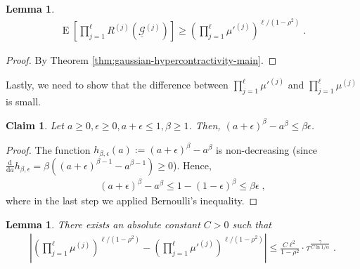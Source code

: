 \documentclass{daj}
\newcommand{\1}{\mathbbm{1}}
\theoremstyle{plain}
\newtheorem{lemma}[theorem]{Lemma}
\newtheorem{claim}[theorem]{Claim}
\theoremstyle{definition}
\DeclareMathOperator*{\EE}{E}
\begin{document}
\begin{lemma}
\label{lem:main-gaussian}
\begin{align*}
\EE \left[ \prod_{j=1}^\ell R^{(j)}(\underline{\mathcal{G}}^{(j)}) \right]
  \ge \left( \prod_{j=1}^\ell \mu'^{(j)} \right)^{\ell / (1-\rho^2)} \; .
\end{align*}
\end{lemma}

\begin{proof}
By Theorem \ref{thm:gaussian-hypercontractivity-main}.
\end{proof}

Lastly, we need to show that the difference between
$\prod_{j=1}^\ell \mu'^{(j)}$ and
$\prod_{j=1}^\ell \mu^{(j)}$ is small.

\begin{claim}
\label{cl:bound-mu}
Let $a \ge 0, \epsilon \ge 0, a+\epsilon \le 1, \beta \ge 1$.
Then, $(a+\epsilon)^\beta - a^\beta \le \beta\epsilon$.
\end{claim}
\begin{proof}
The function $h_{\beta,\epsilon}(a) := (a+\epsilon)^\beta-a^{\beta}$
is non-decreasing (since 
$\frac{\mathrm{d}}{\mathrm da} h_{\beta,\epsilon} = 
\beta((a+\epsilon)^{\beta-1}-a^{\beta-1}) \geq 0$).
Hence, 
\begin{align*}
(a+\epsilon)^\beta-a^\beta \le 1-(1-\epsilon)^\beta \le \beta \epsilon \; ,
\end{align*}
where in the last step we applied Bernoulli's inequality.
\end{proof}

\begin{lemma}
\label{lem:main-mu}
There exists an absolute constant $C > 0$ such that
\begin{align*}
\left| \left( \prod_{j=1}^\ell \mu^{(j)} \right)^{\ell / (1-\rho^2)}  - 
\left( \prod_{j=1}^\ell \mu'^{(j)} \right)^{\ell / (1-\rho^2)}  \right|
\le \frac{C\ell^2}{1-\rho^2} \cdot \tau^{\frac{\gamma}{C \ln 1/\alpha}} \; .
\end{align*}
\end{lemma}
\end{document}
